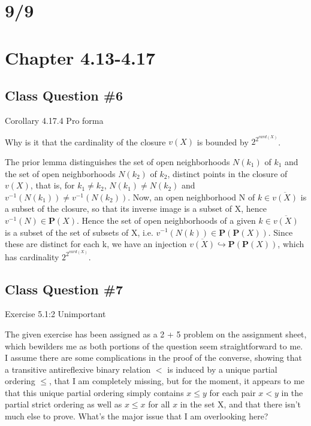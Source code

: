 \documentclass[12pt]{article}
\begin{document}
\section{9/9}

\section{Chapter 4.13-4.17}

\subsection{Class Question \#6}

Corollary 4.17.4
Pro forma

Why is it that the cardinality of the closure $v(X)$ is bounded by $2^{2^{card(X)}}$.

The prior lemma distinguishes the set of open neighborhoods $N(k_1)$ of $k_1$ and the set of open neighborhoods $N(k_2)$ of $k_2$, distinct points in the closure of $v(X)$, that is, for $k_1 \neq k_2$, $N(k_1) \neq N(k_2)$ and $v^{-1}(N(k_1)) \neq v^{-1}(N(k_2))$.  Now, an open neighborhood N of $k \in \overline{v(X)}$ is a subset of the closure, so that its inverse image is a subset of X, hence $v^{-1}(N) \in \textbf{P}(X)$.  Hence the set of open neighborhoods of a given $k \in \overline{v(X)}$ is a subset of the set of subsets of X, i.e. $v^{-1}(N(k)) \in \textbf{P}(\textbf{P}(X))$.  Since these are distinct for each k, we have an injection $\overline{v(X)} \hookrightarrow \textbf{P}(\textbf{P}(X))$, which has cardinality $2^{2^{card(X)}}$.

\subsection{Class Question \#7}

Exercise 5.1:2
Unimportant

The given exercise has been assigned as a 2 + 5 problem on the assignment sheet, which bewilders me as both portions of the question seem straightforward to me.  I assume there are some complications in the proof of the converse, showing that a transitive antireflexive binary relation $<$ is induced by a unique partial ordering $\leq$, that I am completely missing, but for the moment, it appears to me that this unique partial ordering simply contains $x \leq y$ for each pair $x < y$ in the partial strict ordering as well as $x \leq x$ for all $x$ in the set X, and that there isn't much else to prove.  What's the major issue that I am overlooking here?
\end{document}
